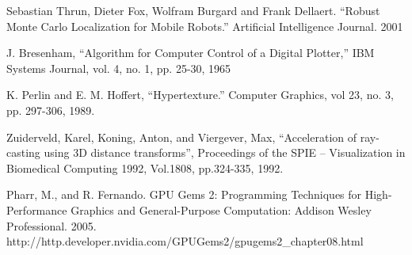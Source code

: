 \documentclass[letterpaper, 10 pt, conference]{ieeeconf}  %
\begin{document}
\begin{thebibliography}{99}

 Sebastian Thrun, Dieter Fox, Wolfram Burgard and Frank Dellaert. “Robust Monte Carlo Localization for Mobile Robots.” Artificial Intelligence Journal. 2001

 J. Bresenham, “Algorithm for Computer Control of a Digital Plotter,” IBM Systems Journal, vol. 4, no. 1, pp. 25-30, 1965

 K. Perlin and E. M. Hoffert, “Hypertexture.” Computer Graphics, vol 23, no. 3, pp. 297-306, 1989.

 Zuiderveld, Karel, Koning, Anton, and Viergever, Max, “Acceleration of ray-casting using 3D distance transforms”, Proceedings of the SPIE – Visualization in Biomedical Computing 1992, Vol.1808, pp.324-335, 1992.
 
 Pharr, M., and R. Fernando. GPU Gems 2: Programming Techniques for High-Performance Graphics and General-Purpose Computation: Addison Wesley Professional. 2005. http://http.developer.nvidia.com/GPUGems2/gpugems2\_chapter08.html

\end{thebibliography}
\end{document}
